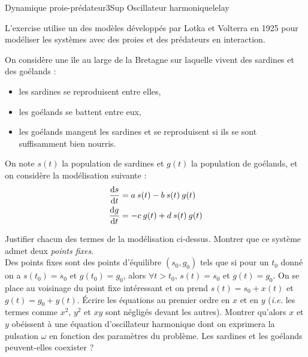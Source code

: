 
\begin{exercise}{Dynamique proie-prédateur}{3}{Sup}
{Oscillateur harmonique}{lelay}

L'exercise utilise un des modèles développés par Lotka et Volterra en 1925 pour modéliser les systèmes avec des proies et des prédateurs en interaction.

On considère une île au large de la Bretagne sur laquelle vivent des sardines et des goélands :
\begin{itemize}
    \item les sardines se reproduisent entre elles,
    \item les goélands se battent entre eux,
    \item les goélands mangent les sardines et se reproduisent si ils se sont suffisamment bien nourris.
\end{itemize}
On note $s(t)$ la population de sardines et $g(t)$ la population de goélands, et on considère la modélisation suivante :
\begin{align*}
    \dv{s}{t} &= a\:s(t) - b\:s(t)\:g(t) \\
    \dv{g}{t} &= -c\:g(t) + d\:s(t)\:g(t)
\end{align*}
\begin{questions}
    \question Justifier chacun des termes de la modélisation ci-dessus.
    \question Montrer que ce système admet deux \emph{points fixes}.\\
    Des points fixes sont des points d'équilibre $(s_0, g_0)$ tels que si pour un $t_0$ donné on a $s(t_0) = s_0$ et $g(t_0) = g_0$, alors $\forall t > t_0$, $s(t) = s_0$ et $g(t) = g_0$.
    \question On se place au voisinage du point fixe intéressant et on prend $s(t) = s_0 + x(t)$ et $g(t) = g_0 + y(t)$. Écrire les équations au premier ordre en $x$ et en $y$ (\emph{i.e.} les termes comme $x^2$, $y^2$ et $xy$ sont négligés devant les autres).
    \question Montrer qu'alors $x$ et $y$ obéissent à une équation d'oscillateur harmonique dont on exprimera la pulsation $\omega$ en fonction des paramètres du problème.
    \question Les sardines et les goélands peuvent-elles coexister ?
\end{questions}
\end{exercise}